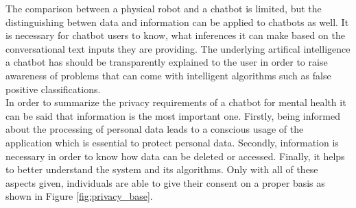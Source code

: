 \documentclass[sigconf, nonacm]{acmart}
\begin{document}
The comparison between a physical robot and a chatbot is limited, but the distinguishing betwen data and information can be applied to chatbots as well. It is necessary for chatbot users to know, what inferences it can make based on the conversational text inputs they are providing. The underlying artifical intelligence a chatbot has should be transparently explained 
to the user in order to raise awareness of problems that can come with intelligent algorithms such as false positive classifications.
\\
In order to summarize the privacy requirements of a chatbot for mental health it can be said that information is the most important one. Firstly, being informed about the processing of personal data leads to a conscious usage of the application which is essential to protect personal data. Secondly, information is necessary in order to know how data can be deleted or accessed. Finally, it helps to better understand the system and 
its algorithms. Only with all of these aspects given, individuals are able to give their consent on a proper basis as shown in Figure \ref{fig:privacy_base}. 
\end{document}
